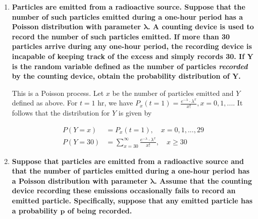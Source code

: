 \documentclass[10pt, oneside]{article}
\begin{document}
\begin{enumerate}[label=8.\arabic*]
In cases where we do not consider all possible outcomes $x_i$, the constant term $b$ needs a "scaling" factor as above. Thus we can conclude that

\begin{align*}
E[\text{Profit}] &= 10 \sum^{10}_{D = 0} D \cdot \frac{e^{-8} \cdot 8^D}{D!} - 30 \sum^{10}_{D = 0} \frac{e^{-8} \cdot 8^D}{D!} \\
&\approx \boxed{\$32.85}
\end{align*}

\newpage
\item  \begin{tcolorbox}[
  colback=Cerulean!5!white,
  colframe=Cerulean!75!black]
\textbf{Particles are emitted from a radioactive source. Suppose that the number of such particles emitted during a one-hour period has a Poisson distribution with parameter $\bm{\lambda}$. A counting device is used to record the number of such particles emitted. If more than 30 particles arrive during any one-hour period, the recording device is incapable of keeping track of the excess and simply records 30. If $\bm{Y}$ is the random variable defined as the number of particles \textit{recorded} by the counting device, obtain the probability distribution of $\bm{Y}$.}
\end{tcolorbox}

This is a Poisson process. Let $x$ be the number of particles emitted and $Y$ defined as above. For $t = 1$ hr, we have $P_x (t = 1) = \frac{e^{-\lambda} \cdot \lambda^x}{x!}, x = 0, 1, ...$. It follows that the distribution for $Y$ is given by

\begin{align*}
P(Y = x) &= P_x (t=1), \quad x = 0, 1, ..., 29 \\
P(Y = 30) &= \sum^{\infty}_{x = 30} \frac{e^{-\lambda} \cdot \lambda^x}{x!}, \quad x \geq 30
\end{align*}

\item  \begin{tcolorbox}[
  colback=Cerulean!5!white,
  colframe=Cerulean!75!black]
\textbf{Suppose that particles are emitted from a radioactive source and that the number of particles emitted during a one-hour period has a Poisson distribution with parameter $\bm{\lambda}$. Assume that the counting device recording these emissions occasionally fails to record an emitted particle. Specifically, suppose that any emitted particle has a probability $\bm{p}$ of being recorded.}
\end{tcolorbox}


\end{enumerate}
\end{document}
